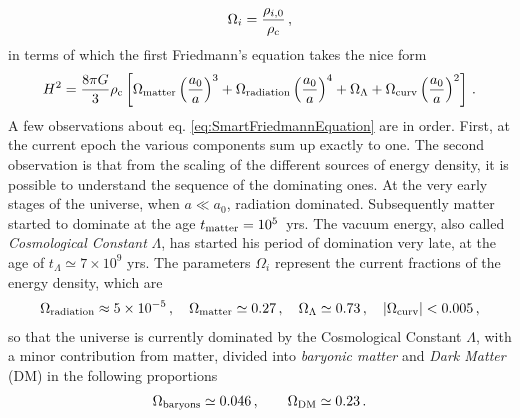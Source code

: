 \documentclass[12pt,a4paper]{book}
\begin{document}
\begin{align}
\label{eq:OmegaParameters}
\Omega_i = \frac{\rho_{i,0}}{\rho_{\rm c}} \,,
\end{align}
in terms of which the first Friedmann's equation takes the nice form
\begin{align}
\label{eq:SmartFriedmannEquation}
H^2 = \frac{8 \pi G}{3} \rho_{\rm c} \left[\Omega_{\rm matter} \left(\frac{a_0}{a}\right)^3 + \Omega_{\rm radiation} \left(\frac{a_0}{a}\right)^4 + \Omega_{\Lambda} + \Omega_{\rm curv} \left(\frac{a_0}{a}\right)^2\right] \,.
\end{align}
A few observations about eq. \eqref{eq:SmartFriedmannEquation} are in order. First, at the current epoch the various components sum up exactly to one. The second observation is that from the scaling of the different sources of energy density, it is possible to understand the sequence of the dominating ones. At the very early stages of the universe, when $a \ll a_0$, radiation dominated. Subsequently matter started to dominate at the age $t_{\rm matter} = 10^5 \,$ yrs. The vacuum energy, also called \textit{Cosmological Constant} $\Lambda$, has started his period of domination very late, at the age of $t_{\Lambda} \simeq 7 \times 10^9$ yrs. The parameters $\Omega_i$ represent the current fractions of the energy density, which are
\begin{align}
\label{eq:CurrentFractions}
\Omega_{\rm radiation} \approx 5 \times 10^{-5} \,, \quad \Omega_{\rm matter} \simeq 0.27 \,, \quad \Omega_{\Lambda} \simeq 0.73 \,, \quad \left|\Omega_{\rm curv}\right| < 0.005 \,,
\end{align}
so that the universe is currently dominated by the Cosmological Constant $\Lambda$, with a minor contribution from matter, divided into \textit{baryonic matter} and \textit{Dark Matter} (DM) in the following proportions
\begin{align}
\label{eq:BaryonAndDM}
\Omega_{\rm baryons} \simeq 0.046 \,, \qquad \Omega_{\rm DM} \simeq 0.23 \,.
\end{align}
\end{document}

